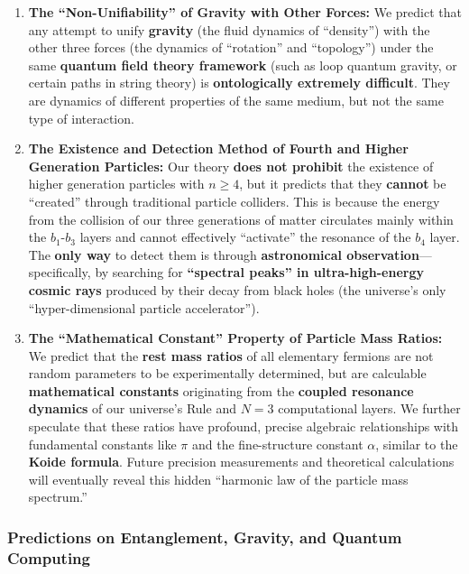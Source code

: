 \documentclass[11pt, a4paper]{article}
\begin{document}
\begin{enumerate}
    \item \textbf{The ``Non-Unifiability'' of Gravity with Other Forces:}
    We predict that any attempt to unify \textbf{gravity} (the fluid dynamics of ``density'') \cite{Newton1687} with the other three forces (the dynamics of ``rotation'' and ``topology'') under the same \textbf{quantum field theory framework} \cite{deBroglie1930} (such as loop quantum gravity, or certain paths in string theory) is \textbf{ontologically extremely difficult}. They are dynamics of different properties of the same medium, but not the same type of interaction.

    \item \textbf{The Existence and Detection Method of Fourth and Higher Generation Particles:}
    Our theory \textbf{does not prohibit} the existence of higher generation particles with $n \ge 4$, but it predicts that they \textbf{cannot} be ``created'' through traditional particle colliders. This is because the energy from the collision of our three generations of matter circulates mainly within the $b_1$-$b_3$ layers and cannot effectively ``activate'' the resonance of the $b_4$ layer. The \textbf{only way} to detect them is through \textbf{astronomical observation}—specifically, by searching for \textbf{``spectral peaks'' in ultra-high-energy cosmic rays} produced by their decay from black holes (the universe's only ``hyper-dimensional particle accelerator'').

    \item \textbf{The ``Mathematical Constant'' Property of Particle Mass Ratios:}
    We predict that the \textbf{rest mass ratios} of all elementary fermions are not random parameters to be experimentally determined, but are calculable \textbf{mathematical constants} originating from the \textbf{coupled resonance dynamics} of our universe's Rule and $N=3$ computational layers. We further speculate that these ratios have profound, precise algebraic relationships with fundamental constants like $\pi$ and the fine-structure constant $\alpha$, similar to the \textbf{Koide formula}. Future precision measurements and theoretical calculations will eventually reveal this hidden ``harmonic law of the particle mass spectrum.''
\end{enumerate}

\subsubsection{Predictions on Entanglement, Gravity, and Quantum Computing}
\end{document}
